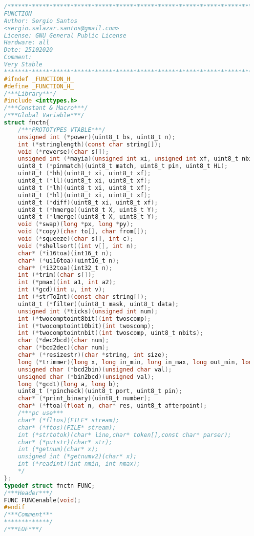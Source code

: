 \begin{lstlisting}[language=C]
/************************************************************************
FUNCTION
Author: Sergio Santos
<sergio.salazar.santos@gmail.com>
License: GNU General Public License
Hardware: all
Date: 25102020
Comment:
Very Stable
************************************************************************/
#ifndef _FUNCTION_H_
#define _FUNCTION_H_
/***Library***/
#include <inttypes.h>
/***Constant & Macro***/
/***Global Variable***/
struct fnctn{
	/***PROTOTYPES VTABLE***/
	unsigned int (*power)(uint8_t bs, uint8_t n);
	int (*stringlength)(const char string[]);
	void (*reverse)(char s[]);
	unsigned int (*mayia)(unsigned int xi, unsigned int xf, uint8_t nbits);
	uint8_t (*pinmatch)(uint8_t match, uint8_t pin, uint8_t HL);
	uint8_t (*hh)(uint8_t xi, uint8_t xf);
	uint8_t (*ll)(uint8_t xi, uint8_t xf);
	uint8_t (*lh)(uint8_t xi, uint8_t xf);
	uint8_t (*hl)(uint8_t xi, uint8_t xf);
	uint8_t (*diff)(uint8_t xi, uint8_t xf);
	uint8_t (*hmerge)(uint8_t X, uint8_t Y);
	uint8_t (*lmerge)(uint8_t X, uint8_t Y);
	void (*swap)(long *px, long *py);
	void (*copy)(char to[], char from[]);
	void (*squeeze)(char s[], int c);
	void (*shellsort)(int v[], int n);
	char* (*i16toa)(int16_t n);
	char* (*ui16toa)(uint16_t n);
	char* (*i32toa)(int32_t n);
	int (*trim)(char s[]);
	int (*pmax)(int a1, int a2);
	int (*gcd)(int u, int v);
	int (*strToInt)(const char string[]);
	uint8_t (*filter)(uint8_t mask, uint8_t data);
	unsigned int (*ticks)(unsigned int num);
	int (*twocomptoint8bit)(int twoscomp);
	int (*twocomptoint10bit)(int twoscomp);
	int (*twocomptointnbit)(int twoscomp, uint8_t nbits);
	char (*dec2bcd)(char num);
	char (*bcd2dec)(char num);
	char* (*resizestr)(char *string, int size);
	long (*trimmer)(long x, long in_min, long in_max, long out_min, long out_max);
	unsigned char (*bcd2bin)(unsigned char val);
	unsigned char (*bin2bcd)(unsigned val);
	long (*gcd1)(long a, long b);
	uint8_t (*pincheck)(uint8_t port, uint8_t pin);
	char* (*print_binary)(uint8_t number);
	char* (*ftoa)(float n, char* res, uint8_t afterpoint);
	/***pc use***
	char* (*fltos)(FILE* stream);
	char* (*ftos)(FILE* stream);
	int (*strtotok)(char* line,char* token[],const char* parser);
	char* (*putstr)(char* str);
	int (*getnum)(char* x);
	unsigned int (*getnumv2)(char* x);
	int (*readint)(int nmin, int nmax);
	*/
};
typedef struct fnctn FUNC;
/***Header***/
FUNC FUNCenable(void);
#endif
/***Comment***
*************/
/***EOF***/
\end{lstlisting}
